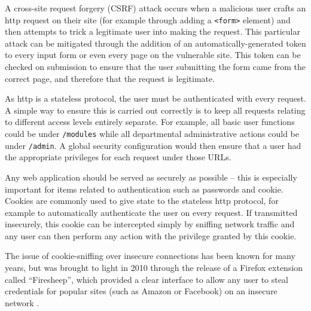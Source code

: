 A cross-site request forgery (CSRF) attack occurs when a malicious user crafts
an \gls{http} request on their site (for example through adding a
\texttt{<form>} element) and then attempts to trick a legitimate user into
making the request. This particular attack can be mitigated through the
addition of an automatically-generated token to every input form or even every
page on the vulnerable site. This token can be checked on submission to ensure
that the user submitting the form came from the correct page, and therefore
that the request is legitimate.

\mynobreakpar

As \gls{http} is a stateless protocol, the user must be authenticated with
every request. A simple way to ensure this is carried out correctly is to keep
all requests relating to different access levels entirely separate. For
example, all basic user functions could be under \texttt{/modules} while all
departmental administrative actions could be under \texttt{/admin}. A global
security configuration would then ensure that a user had the appropriate
privileges for each request under those URLs.

\mynobreakpar

Any web application should be served as securely as possible -- this is
especially important for items related to authentication such as passwords and
\gls{cookie}. Cookies are commonly used to give state to the stateless
\gls{http} protocol, for example to automatically authenticate the user on
every request. If transmitted insecurely, this cookie can be intercepted
simply by sniffing network traffic and any user can then perform any action
with the privilege granted by this cookie.

The issue of cookie-sniffing over insecure connections has been known for many
years, but was brought to light in 2010 through the release of a Firefox
extension called ``Firesheep'', which provided a clear interface to allow any
user to steal credentials for popular sites (such as Amazon or Facebook) on an
insecure network \cite{FiresheepHow_2011}.
